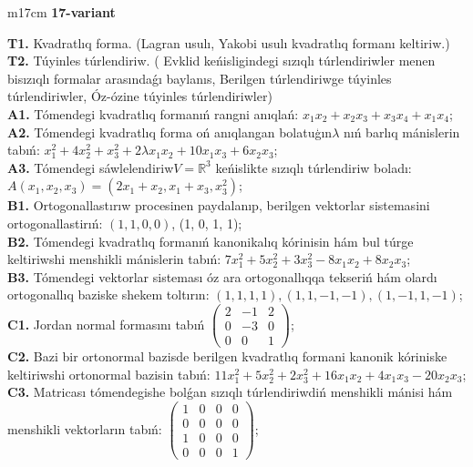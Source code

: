 \documentclass{article}
\begin{document}
\vspace{1cm}


\begin{tabular}{m{17cm}}
\textbf{17-variant}
\newline

\textbf{T1.} Kvadratlıq forma. (Lagran usulı, Yakobi usulı kvadratlıq formanı keltiriw.) \\
\textbf{T2.} Túyinles túrlendiriw. ( Evklid keńisligindegi sızıqlı túrlendiriwler menen bisızıqlı formalar arasındaǵı baylanıs, Berilgen túrlendiriwge túyinles túrlendiriwler, Óz-ózine túyinles túrlendiriwler) \\
\textbf{A1.} Tómendegi kvadratlıq formanıń rangni anıqlań: \(x_{1}x_{2} + x_{2}x_{3} + x_{3}x_{4} + x_{1}x_{4}\); \\
\textbf{A2.} Tómendegi kvadratlıq forma oń anıqlangan bolatuģın\(\lambda\) nıń barlıq mánislerin tabıń: \(x_{1}^{2} + 4x_{2}^{2} + x_{3}^{2} + 2\lambda x_{1}x_{2} + 10x_{1}x_{3} + 6x_{2}x_{3}\); \\
\textbf{A3.} Tómendegi sáwlelendiriw\(V = \mathbb{R}^{3}\) keńislikte sızıqlı túrlendiriw boladı: \(A\left( x_{1},x_{2},x_{3} \right) = \left( 2x_{1} + x_{2},x_{1} + x_{3},x_{3}^{2} \right)\); \\
\textbf{B1.} Ortogonallastırıw procesinen paydalanıp, berilgen vektorlar sistemasini ortogonallastirıń: \((1,1,0,0)\), (1, 0, 1, 1); \\
\textbf{B2.} Tómendegi kvadratlıq formanıń kanonikalıq kórinisin hám bul túrge keltiriwshi menshikli mánislerin tabıń: \(7x_{1}^{2} + 5x_{2}^{2} + 3x_{3}^{2} - 8x_{1}x_{2} + 8x_{2}x_{3}\); \\
\textbf{B3.} Tómendegi vektorlar sisteması óz ara ortogonallıqqa tekseriń hám olardı ortogonallıq baziske shekem toltırın: \((1,1,1,1),(1,1, - 1, - 1),(1, - 1,1, - 1)\); \\
\textbf{C1.} Jordan normal formasını tabıń \(\begin{pmatrix} 2 & - 1 & 2 \\ 0 & - 3 & 0 \\ 0 & 0 & 1 \end{pmatrix}\); \\
\textbf{C2.} Bazi bir ortonormal bazisde berilgen kvadratlıq formani kanonik kóriniske keltiriwshi ortonormal bazisin tabıń: \(11x_{1}^{2} + 5x_{2}^{2} + 2x_{3}^{2} + 16x_{1}x_{2} + 4x_{1}x_{3} - 20x_{2}x_{3}\); \\
\textbf{C3.} Matricası tómendegishe bolǵan sızıqlı túrlendiriwdiń menshikli mánisi hám menshikli vektorların tabıń: \(\begin{pmatrix} 1 & 0 & 0 & 0 \\ 0 & 0 & 0 & 0 \\ 1 & 0 & 0 & 0 \\ 0 & 0 & 0 & 1 \end{pmatrix}\); \\

\end{tabular}
\vspace{1cm}
\end{document}
